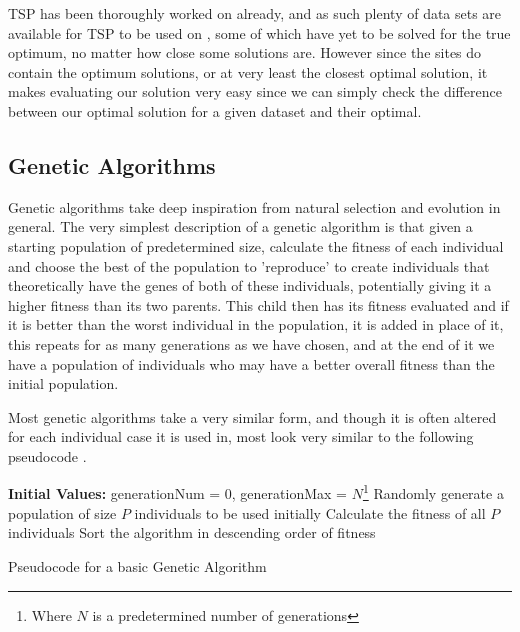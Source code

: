 \documentclass[11pt,a4paper,titlepage]{article}
\begin{document}
TSP has been thoroughly worked on already, and as such plenty of data sets are available for TSP to be used on \cite{TSPRep1, TSPRep2}, some of which have yet to be solved for the true optimum, no matter how close some solutions are. However since the sites do contain the optimum solutions, or at very least the closest optimal solution, it makes evaluating our solution very easy since we can simply check the difference between our optimal solution for a given dataset and their optimal.

\subsection{Genetic Algorithms}
Genetic algorithms take deep inspiration from natural selection and evolution in general. The very simplest description of a genetic algorithm is that given a starting population of predetermined size, calculate the fitness of each individual and choose the best of the population to 'reproduce' to create individuals that theoretically have the genes of both of these individuals, potentially giving it a higher fitness than its two parents. This child then has its fitness evaluated and if it is better than the worst individual in the population, it is added in place of it, this repeats for as many generations as we have chosen, and at the end of it we have a population of individuals who may have a better overall fitness than the initial population.

Most genetic algorithms take a very similar form, and though it is often altered for each individual case it is used in, most look very similar to the following pseudocode \cite{GAIntro}.
\clearpage

\begin{algorithm}[H]
\SetAlgoLined
\textbf{Initial Values:} generationNum = 0, generationMax = $N$\footnote{Where $N$ is a predetermined number of generations}\;
Randomly generate a population of size $P$ individuals to be used initially\;
Calculate the fitness of all $P$ individuals\;
Sort the algorithm in descending order of fitness\;
\caption{Pseudocode for a basic Genetic Algorithm}
\end{algorithm}
\end{document}
